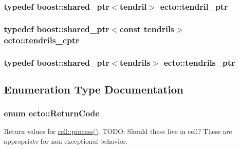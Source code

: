 \hypertarget{namespaceecto_a84fb5f6130275382e5cbeb5fdececa78}{
\subsubsection[{tendril\-\_\-ptr}]{\setlength{\rightskip}{0pt plus 5cm}typedef boost\-::shared\-\_\-ptr$<${\bf tendril}$>$ {\bf ecto\-::tendril\-\_\-ptr}}}\label{namespaceecto_a84fb5f6130275382e5cbeb5fdececa78}
\hypertarget{namespaceecto_a6165b23b34082cfc17104ca7e9f1b212}{
\subsubsection[{tendrils\-\_\-cptr}]{\setlength{\rightskip}{0pt plus 5cm}typedef boost\-::shared\-\_\-ptr$<$const {\bf tendrils}$>$ {\bf ecto\-::tendrils\-\_\-cptr}}}\label{namespaceecto_a6165b23b34082cfc17104ca7e9f1b212}
\hypertarget{namespaceecto_a89953a225525948cb71d5488c3c6472b}{
\subsubsection[{tendrils\-\_\-ptr}]{\setlength{\rightskip}{0pt plus 5cm}typedef boost\-::shared\-\_\-ptr$<${\bf tendrils}$>$ {\bf ecto\-::tendrils\-\_\-ptr}}}\label{namespaceecto_a89953a225525948cb71d5488c3c6472b}


\subsection{\-Enumeration \-Type \-Documentation}
\hypertarget{namespaceecto_a93d82cd28db695d53963fb696582762c}{
\subsubsection[{\-Return\-Code}]{\setlength{\rightskip}{0pt plus 5cm}enum {\bf ecto\-::\-Return\-Code}}}\label{namespaceecto_a93d82cd28db695d53963fb696582762c}


\-Return values for \hyperlink{structecto_1_1cell_a6b810671ee21f5dddbc1206abfb999f3}{cell\-::process()}. \-T\-O\-D\-O\-: \-Should these live in cell? \-These are appropriate for non exceptional behavior. 

